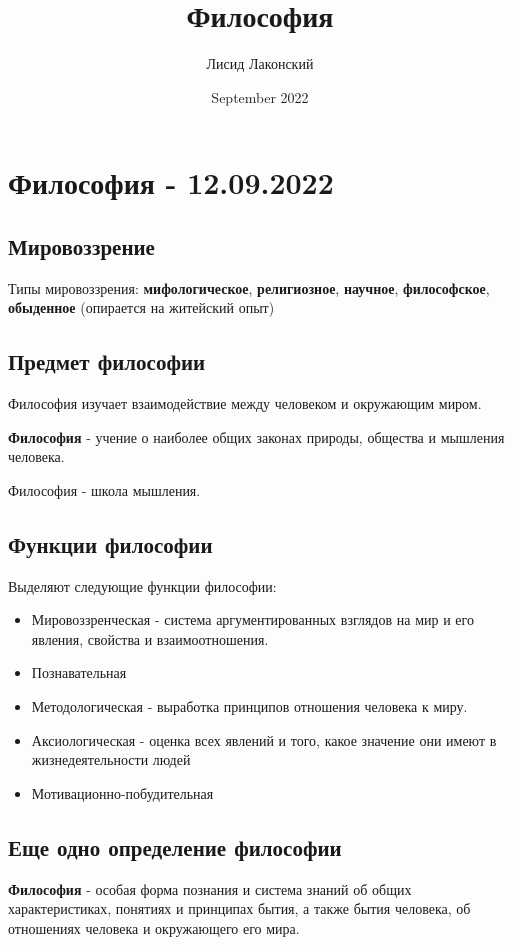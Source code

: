 \documentclass{article}
\title{Философия}
\author{Лисид Лаконский}
\date{September 2022}
\begin{document}
\maketitle
\tableofcontents
\pagebreak

\section{Философия - 12.09.2022}

\subsection{Мировоззрение}

\begin{flushleft}

Типы мировоззрения: \textbf{мифологическое}, \textbf{религиозное}, \textbf{научное}, \textbf{философское}, \textbf{обыденное} (опирается на житейский опыт)

\subsection{Предмет философии}

Философия изучает взаимодействие между человеком и окружающим миром.

\textbf{Философия} - учение о наиболее общих законах природы, общества и мышления человека.

Философия - школа мышления.

\subsection{Функции философии}

Выделяют следующие функции философии:

\begin{itemize}
    \item Мировоззренческая - система аргументированных взглядов на мир и его явления, свойства и взаимоотношения.
    \item Познавательная
    \item Методологическая - выработка принципов отношения человека к миру.
    \item Аксиологическая - оценка всех явлений и того, какое значение они имеют в жизнедеятельности людей
    \item Мотивационно-побудительная
\end{itemize}

\subsection{Еще одно определение философии}

\textbf{Философия} - особая форма познания и система знаний об общих характеристиках, понятиях и принципах бытия, а также бытия человека, об отношениях человека и окружающего его мира.

\end{flushleft}
\end{document}
